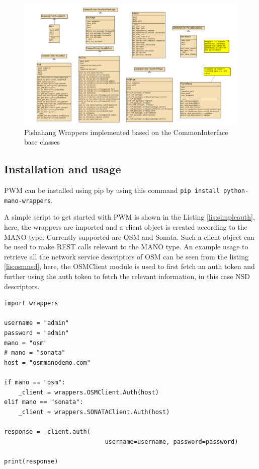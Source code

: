 \begin{figure}
	\centering
	\includegraphics[width=1\linewidth]{figures/pishahang_class_diagram}
	\caption{Pishahang Wrappers implemented based on the CommonInterface base classes}
	\label{fig:osmclassdiagram}
\end{figure}


\subsection{Installation and usage}

PWM can be installed using pip by using this command \texttt{pip install python-mano-wrappers}. 

A simple script to get started with PWM is shown in the Listing \ref{lis:simpleauth}, here, the wrappers are imported and a client object is created according to the MANO type. 
Currently supported are OSM and Sonata. 
Such a client object can be used to make REST calls relevant to the MANO type. 
An example usage to retrieve all the network service descriptors of OSM can be seen from the listing \ref{lis:osmnsd}, here, the OSMClient module is used to first fetch an auth token and further using the auth token to fetch the relevant information, in this case NSD descriptors.


\begin{lstlisting}[caption=Simple wrapper code to fetch token, label=lis:simpleauth]
import wrappers

username = "admin"
password = "admin"
mano = "osm"
# mano = "sonata"
host = "osmmanodemo.com"

if mano == "osm":
	_client = wrappers.OSMClient.Auth(host)
elif mano == "sonata":
	_client = wrappers.SONATAClient.Auth(host)

response = _client.auth(
							username=username, password=password)

print(response)

\end{lstlisting}

